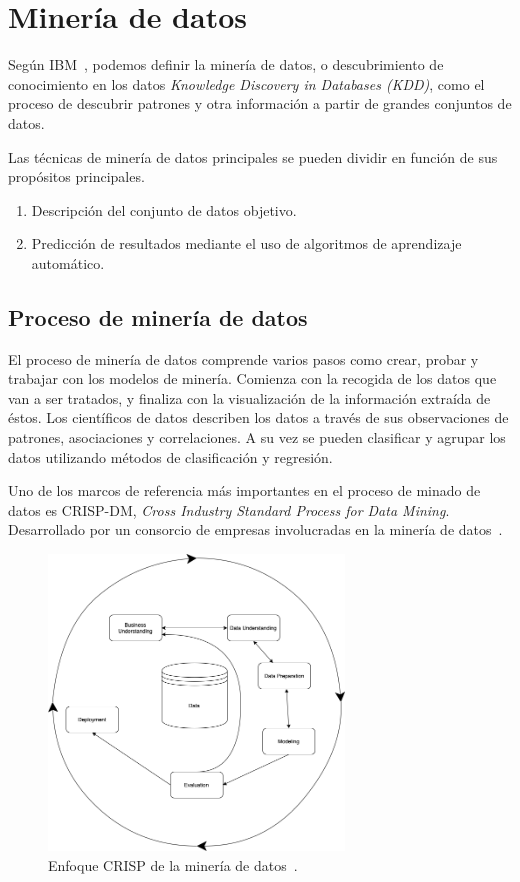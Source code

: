 \clearpage
\section{Minería de datos}

Según IBM~\cite{IBM-WhatisDataMining}, podemos definir la minería de datos, o descubrimiento de conocimiento
en los datos \textit{Knowledge Discovery in Databases (KDD)}, como el proceso de descubrir patrones y otra
información a partir de grandes conjuntos de datos. 

Las técnicas de minería de datos principales se pueden dividir en función de sus propósitos principales.
\begin{enumerate}
    \item Descripción del conjunto de datos objetivo.
    \item Predicción de resultados mediante el uso de algoritmos de aprendizaje automático.
\end{enumerate}

\subsection{Proceso de minería de datos}
El proceso de minería de datos comprende varios pasos como crear, probar y trabajar con los modelos de minería. Comienza con la recogida de los datos que van a ser tratados, y finaliza con la visualización de la información extraída de éstos. 
Los científicos de datos describen los datos a través de sus observaciones de patrones, asociaciones y correlaciones. A su vez se pueden clasificar y agrupar los datos utilizando métodos de clasificación y regresión.

Uno de los marcos de referencia más importantes en el proceso de minado de datos es CRISP-DM, \textit{Cross Industry Standard Process for Data Mining}. Desarrollado por un consorcio de empresas involucradas en la minería de datos~\cite{Chapman2000CRISPDM1S}.

\begin{figure}
\centering
\includegraphics[width=0.7\textwidth]{./img/memoria/CRISP-DM}
\caption{Enfoque CRISP de la minería de datos~\cite{KOTU201517}.}
\label{./img/memoria/CRISP-DM}
\end{figure}

